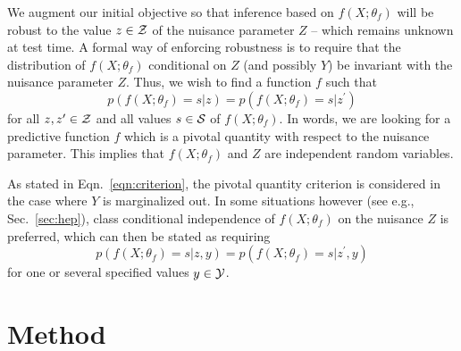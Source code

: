 \documentclass[twocolumn,superscriptaddress,aps]{revtex4-1}
\theoremstyle{plain}
\begin{document}
We augment our initial objective so that inference based on $f(X ; \theta_f)$ will be
robust to the value $z \in {\cal Z}$ of the nuisance parameter $Z$  -- which remains unknown at
test time. A formal way of enforcing robustness is to require that the distribution of
$f(X ; \theta_f)$ conditional on $Z$ (and possibly $Y$) be invariant with
 the nuisance parameter $Z$. Thus, we wish to find a function $f$ such that
\begin{equation}\label{eqn:criterion}
    p(f(X ; \theta_f) = s | z ) = p(f(X ; \theta_f) = s | z^\prime )
\end{equation}
for all $z,z^\prime \in  {\cal Z}$ and all values $s \in {\cal S}$ of $f(X ; \theta_f)$.
In words, we are looking for a predictive function $f$
which is a pivotal quantity \citep{degroot1986probability} with respect to the
nuisance parameter. This implies that  $f(X; \theta_f)$ and $Z$ are independent random variables.

As stated in Eqn.~\ref{eqn:criterion}, the pivotal quantity criterion is
considered in the case where $Y$ is marginalized out. In some situations
however (see e.g., Sec.~\ref{sec:hep}), class conditional independence of $f(X;
\theta_f)$ on the nuisance $Z$ is preferred, which can then be stated as
requiring
\begin{equation}\label{eqn:criterion-class}
    p(f(X ; \theta_f) = s | z, y ) = p(f(X ; \theta_f) = s | z^\prime, y )
\end{equation}
for one or several specified values $y \in {\cal Y}$.





\section{Method}
\label{sec:method}
\end{document}
